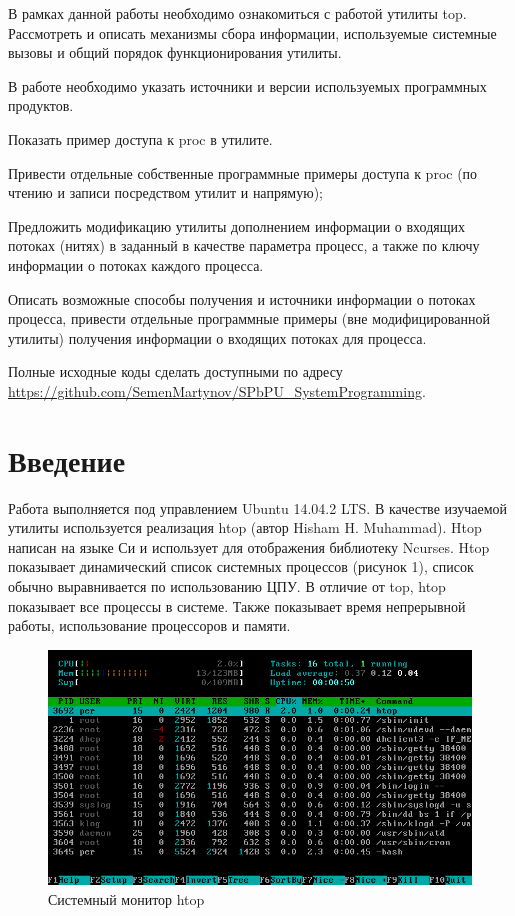 \documentclass[a4paper, 12pt]{article}		%
\begin{document}
В рамках данной работы необходимо ознакомиться с работой утилиты top. Рассмотреть и описать механизмы сбора информации, используемые системные вызовы и общий порядок функционирования утилиты.
\vspace{3em}

В работе необходимо указать источники и версии используемых программных продуктов.
\vspace{1em}

Показать пример доступа к proc в утилите.
\vspace{1em}

Привести отдельные собственные программные примеры доступа к proc (по чтению и записи посредством утилит и напрямую);
\vspace{1em}

Предложить модификацию утилиты дополнением информации о входящих потоках (нитях) в заданный в качестве параметра процесс, а также по ключу информации о потоках каждого процесса.
\vspace{1em}

Описать возможные способы получения и источники информации о потоках процесса, привести отдельные программные примеры (вне модифицированной утилиты) получения  информации о входящих потоках для процесса.
\vspace{1em}

Полные исходные коды сделать доступными по адресу \url{https://github.com/SemenMartynov/SPbPU_SystemProgramming}.

\newpage
\section*{Введение}

Работа выполняется под управлением Ubuntu 14.04.2 LTS. В качестве изучаемой утилиты используется реализация htop (автор Hisham H. Muhammad). Htop написан на языке Си и использует для отображения библиотеку Ncurses. Htop показывает динамический список системных процессов (рисунок 1), список обычно выравнивается по использованию ЦПУ. В отличие от top, htop показывает все процессы в системе. Также показывает время непрерывной работы, использование процессоров и памяти.

\begin{figure}[h!]
\centering
\includegraphics[scale=0.65]{res/Htop}
\caption{Системный монитор htop}
\end{figure}
\end{document}
